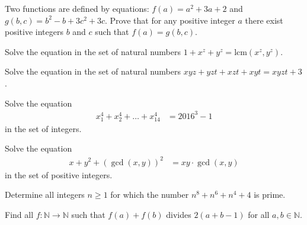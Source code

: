 \documentclass[problems.tex]{subfile}
\begin{document}
	\begin{problem}
		Two functions are defined by equations: $f(a) = a^2 + 3a + 2$ and $g(b, c) = b^2 - b + 3c^2 + 3c$. Prove that for any positive integer $a$ there exist positive integers $b$ and $c$ such that $f(a) = g(b, c)$. %
	\end{problem}

	\begin{problem}
		Solve the equation in the set of natural numbers $1+x^z + y^z = \text{lcm}(x^z,y^z)$. %
	\end{problem}

	\begin{problem}
		Solve the equation in the set of natural numbers $xyz+yzt+xzt+xyt = xyzt + 3$. %
	\end{problem}

	\begin{problem}
		Solve the equation
		\begin{align*}
			x_1^4 + x_2^4 + \dots + x_{14}^4 &= 2016^3 -1
		\end{align*}
		in the set of integers.
	\end{problem}

	\begin{problem}
		Solve the equation
		\begin{align*}
			x + y^2 + \left(\gcd(x,y)\right)^2 &= xy \cdot \gcd(x,y)
		\end{align*}
		in the set of positive integers.
	\end{problem}

	\begin{problem}
		Determine all integers $n\ge1$ for which the number $n^8+n^6+n^4+4$ is prime. %
	\end{problem}

	\begin{problem}
		Find all $f : \mathbb{N} \to \mathbb{N} $ such that $f(a) + f(b)$ divides $2(a + b - 1)$ for all $a, b \in \mathbb{N}$. %
	\end{problem}
\end{document}
